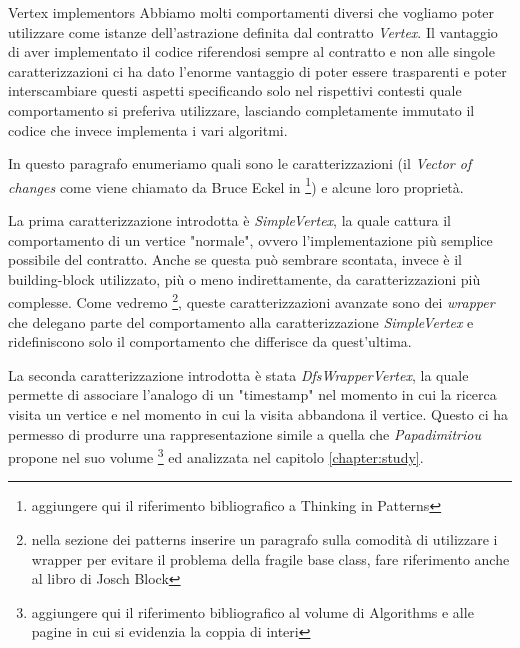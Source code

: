 \begin{paragraph}{Vertex implementors}
  Abbiamo molti comportamenti diversi che vogliamo poter utilizzare
  come istanze dell'astrazione definita dal contratto
  \emph{Vertex}. Il vantaggio di aver implementato il codice
  riferendosi sempre al contratto e non alle singole caratterizzazioni
  ci ha dato l'enorme vantaggio di poter essere trasparenti e poter
  interscambiare questi aspetti specificando solo nel rispettivi
  contesti quale comportamento si preferiva utilizzare, lasciando
  completamente immutato il codice che invece implementa i vari
  algoritmi.

  In questo paragrafo enumeriamo quali sono le caratterizzazioni (il
  \emph{Vector of changes} come viene chiamato da Bruce Eckel in
  \footnote{aggiungere qui il riferimento bibliografico a Thinking in
    Patterns}) e alcune loro propriet\`a.

  La prima caratterizzazione introdotta \`e \emph{SimpleVertex}, la
  quale cattura il comportamento di un vertice "normale", ovvero
  l'implementazione pi\`u semplice possibile del contratto. Anche se
  questa pu\`o sembrare scontata, invece \`e il building-block
  utilizzato, pi\`u o meno indirettamente, da caratterizzazioni pi\`u
  complesse. Come vedremo \footnote{nella sezione dei patterns
    inserire un paragrafo sulla comodit\`a di utilizzare i wrapper per
    evitare il problema della fragile base class, fare riferimento
    anche al libro di Josch Block}, queste caratterizzazioni avanzate
  sono dei \emph{wrapper} che delegano parte del comportamento alla
  caratterizzazione \emph{SimpleVertex} e ridefiniscono solo il
  comportamento che differisce da quest'ultima.

  La seconda caratterizzazione introdotta \`e stata
  \emph{DfsWrapperVertex}, la quale permette di associare l'analogo di
  un "timestamp" nel momento in cui la ricerca visita un vertice e nel
  momento in cui la visita abbandona il vertice. Questo ci ha permesso
  di produrre una rappresentazione simile a quella che
  \emph{Papadimitriou} propone nel suo volume \footnote{aggiungere qui
    il riferimento bibliografico al volume di Algorithms e alle pagine
    in cui si evidenzia la coppia di interi} ed analizzata nel
  capitolo \ref{chapter:study}.


\end{paragraph}
